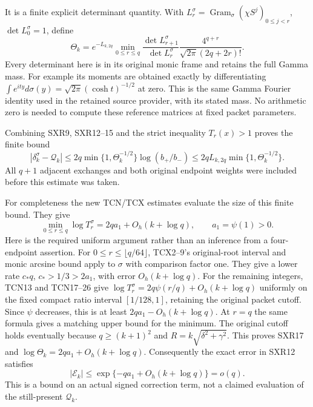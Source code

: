 \documentclass[11pt,a4paper]{article}
\begin{document}
It is a finite explicit determinant quantity. With
$L_r^\sigma=\operatorname{Gram}_\sigma(\chi S^j)_{0\le j<r}$,
$\det L_0^\sigma=1$, define
\begin{equation}\tag{SXR15}
 \Theta_k=e^{-L_{k,2q}}
   \min_{0\le r\le q}
   \frac{\det L_{r+1}^\sigma}{\det L_r^\sigma}
       \frac{4^{q+r}}{\sqrt{2\pi}(2q+2r)!}.
\end{equation}
Every determinant here is in its original monic frame and retains
the full Gamma mass. For example its moments are obtained exactly
by differentiating
$\int e^{ity}d\sigma(y)=\sqrt{2\pi}(\cosh t)^{-1/2}$ at zero.
This is the same Gamma Fourier identity used in the retained source
provider, with its stated mass. No arithmetic zero is needed to
compute these reference matrices at fixed packet parameters.

Combining SXR9, SXR12--15 and the strict inequality $T_r(x)>1$
proves the finite bound
\begin{equation}\tag{SXR16}
 \boxed{|\delta_k^\sigma-\mathcal Q_k|
 \le 2q\min\{1,\Theta_k^{-1/2}\}\log(b_+/b_-)
 \le 2q L_{k,2q}\min\{1,\Theta_k^{-1/2}\}.}
\end{equation}
All $q+1$ adjacent exchanges and both original endpoint weights
were included before this estimate was taken.

For completeness the new TCN/TCX estimates evaluate the size of
this finite bound. They give
\begin{equation}\tag{SXR17}
 \min_{0\le r\le q}\log T_r^\sigma
        =2q a_1+O_h(k+\log q),\qquad a_1=\psi(1)>0.
\end{equation}
Here is the required uniform argument rather than an inference
from a four-endpoint assertion. For
$0\le r\le\lfloor q/64\rfloor$, TCX2--9's original-root interval
and monic arcsine bound apply to $\sigma$ with comparison factor
one. They give a lower rate $c_*q$, $c_*>1/3>2a_1$, with
error $O_h(k+\log q)$. For the remaining integers, TCN13 and
TCN17--26 give $\log T_r^\sigma=2q\psi(r/q)+O_h(k+\log q)$
uniformly on the fixed compact ratio interval $[1/128,1]$,
retaining the original packet cutoff. Since $\psi$ decreases,
this is at least $2qa_1-O_h(k+\log q)$. At $r=q$ the same formula
gives a matching upper bound for the minimum. The original cutoff
holds eventually because $q\ge(k+1)^2$ and
$R=k\sqrt{\delta^2+\gamma^2}$. This proves SXR17 and
$\log\Theta_k=2qa_1+O_h(k+\log q)$.
Consequently the exact error in SXR12 satisfies
\begin{equation}\tag{SXR18}
 \boxed{|\mathcal E_k|
       \le\exp\{-qa_1+O_h(k+\log q)\}=o(q).}
\end{equation}
This is a bound on an actual signed correction term, not a claimed
evaluation of the still-present $\mathcal Q_k$.
\end{document}
